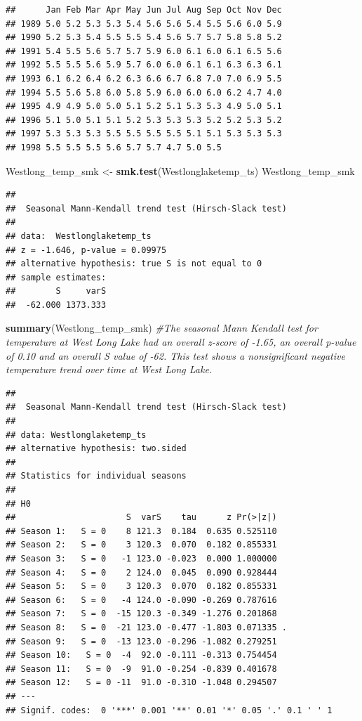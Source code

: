 \documentclass[12pt,]{article}
\newenvironment{Shaded}{\begin{snugshade}}{\end{snugshade}}
\newcommand{\KeywordTok}[1]{\textcolor[rgb]{0.13,0.29,0.53}{\textbf{#1}}}
\newcommand{\StringTok}[1]{\textcolor[rgb]{0.31,0.60,0.02}{#1}}
\newcommand{\CommentTok}[1]{\textcolor[rgb]{0.56,0.35,0.01}{\textit{#1}}}
\newcommand{\NormalTok}[1]{#1}
\begin{document}
\begin{verbatim}
##      Jan Feb Mar Apr May Jun Jul Aug Sep Oct Nov Dec
## 1989 5.0 5.2 5.3 5.3 5.4 5.6 5.6 5.4 5.5 5.6 6.0 5.9
## 1990 5.2 5.3 5.4 5.5 5.5 5.4 5.6 5.7 5.7 5.8 5.8 5.2
## 1991 5.4 5.5 5.6 5.7 5.7 5.9 6.0 6.1 6.0 6.1 6.5 5.6
## 1992 5.5 5.5 5.6 5.9 5.7 6.0 6.0 6.1 6.1 6.3 6.3 6.1
## 1993 6.1 6.2 6.4 6.2 6.3 6.6 6.7 6.8 7.0 7.0 6.9 5.5
## 1994 5.5 5.6 5.8 6.0 5.8 5.9 6.0 6.0 6.0 6.2 4.7 4.0
## 1995 4.9 4.9 5.0 5.0 5.1 5.2 5.1 5.3 5.3 4.9 5.0 5.1
## 1996 5.1 5.0 5.1 5.1 5.2 5.3 5.3 5.3 5.2 5.2 5.3 5.2
## 1997 5.3 5.3 5.3 5.5 5.5 5.5 5.5 5.1 5.1 5.3 5.3 5.3
## 1998 5.5 5.5 5.5 5.6 5.7 5.7 4.7 5.0 5.5
\end{verbatim}

\begin{Shaded}
\begin{Highlighting}[]
\NormalTok{Westlong_temp_smk <-}\StringTok{ }\KeywordTok{smk.test}\NormalTok{(Westlonglaketemp_ts)}
\NormalTok{Westlong_temp_smk}
\end{Highlighting}
\end{Shaded}

\begin{verbatim}
## 
##  Seasonal Mann-Kendall trend test (Hirsch-Slack test)
## 
## data:  Westlonglaketemp_ts
## z = -1.646, p-value = 0.09975
## alternative hypothesis: true S is not equal to 0
## sample estimates:
##        S     varS 
##  -62.000 1373.333
\end{verbatim}

\begin{Shaded}
\begin{Highlighting}[]
\KeywordTok{summary}\NormalTok{(Westlong_temp_smk) }\CommentTok{#The seasonal Mann Kendall test for temperature at West Long Lake had an overall z-score of -1.65, an overall p-value of 0.10 and an overall S value of -62. This test shows a nonsignificant negative temperature trend over time at West Long Lake.}
\end{Highlighting}
\end{Shaded}

\begin{verbatim}
## 
##  Seasonal Mann-Kendall trend test (Hirsch-Slack test)
## 
## data: Westlonglaketemp_ts
## alternative hypothesis: two.sided
## 
## Statistics for individual seasons
## 
## H0
##                      S  varS    tau      z Pr(>|z|)  
## Season 1:   S = 0    8 121.3  0.184  0.635 0.525110  
## Season 2:   S = 0    3 120.3  0.070  0.182 0.855331  
## Season 3:   S = 0   -1 123.0 -0.023  0.000 1.000000  
## Season 4:   S = 0    2 124.0  0.045  0.090 0.928444  
## Season 5:   S = 0    3 120.3  0.070  0.182 0.855331  
## Season 6:   S = 0   -4 124.0 -0.090 -0.269 0.787616  
## Season 7:   S = 0  -15 120.3 -0.349 -1.276 0.201868  
## Season 8:   S = 0  -21 123.0 -0.477 -1.803 0.071335 .
## Season 9:   S = 0  -13 123.0 -0.296 -1.082 0.279251  
## Season 10:   S = 0  -4  92.0 -0.111 -0.313 0.754454  
## Season 11:   S = 0  -9  91.0 -0.254 -0.839 0.401678  
## Season 12:   S = 0 -11  91.0 -0.310 -1.048 0.294507  
## ---
## Signif. codes:  0 '***' 0.001 '**' 0.01 '*' 0.05 '.' 0.1 ' ' 1
\end{verbatim}
\end{document}
